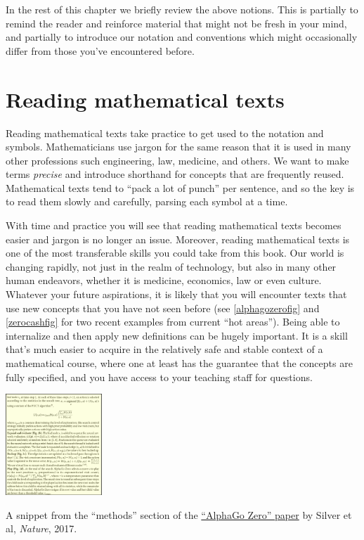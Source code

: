 In the rest of this chapter we briefly review the above notions. This is
partially to remind the reader and reinforce material that might not be
fresh in your mind, and partially to introduce our notation and
conventions which might occasionally differ from those you've
encountered before.

\section{Reading mathematical texts}\label{Reading-mathematical-text}

Reading mathematical texts take practice to get used to the notation and
symbols. Mathematicians use jargon for the same reason that it is used
in many other professions such engineering, law, medicine, and others.
We want to make terms \emph{precise} and introduce shorthand for
concepts that are frequently reused. Mathematical texts tend to ``pack a
lot of punch'' per sentence, and so the key is to read them slowly and
carefully, parsing each symbol at a time.

With time and practice you will see that reading mathematical texts
becomes easier and jargon is no longer an issue. Moreover, reading
mathematical texts is one of the most transferable skills you could take
from this book. Our world is changing rapidly, not just in the realm of
technology, but also in many other human endeavors, whether it is
medicine, economics, law or even culture. Whatever your future
aspirations, it is likely that you will encounter texts that use new
concepts that you have not seen before (see \cref{alphagozerofig} and
\cref{zerocashfig} for two recent examples from current ``hot areas'').
Being able to internalize and then apply new definitions can be hugely
important. It is a skill that's much easier to acquire in the relatively
safe and stable context of a mathematical course, where one at least has
the guarantee that the concepts are fully specified, and you have access
to your teaching staff for questions.


\begin{marginfigure}
\centering
\includegraphics[width=\linewidth, height=1.5in, keepaspectratio]{../figure/alphagozero.png}
\caption{A snippet from the ``methods'' section of the
\href{https://goo.gl/k8pVpL}{``AlphaGo Zero'' paper} by Silver et al,
\emph{Nature}, 2017.}
\label{alphagozerofig}
\end{marginfigure}


